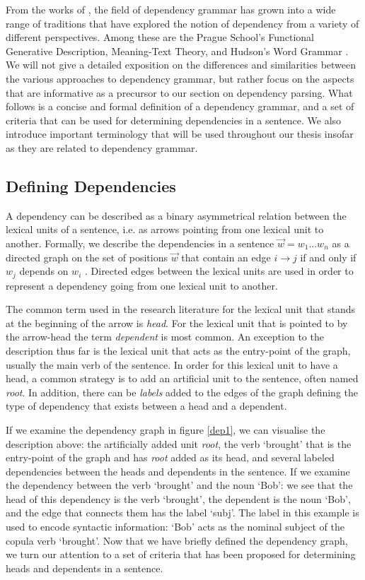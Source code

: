 From the works of \citeauthor{Tes:15}, the field of dependency grammar has grown into a wide range of traditions that have explored the notion of dependency from a variety of different perspectives. Among these are the Prague School's Functional Generative Description, Meaning-Text Theory, and Hudson's Word Grammar \cite{Sgall:86, Mel:88, Hudson:90}. We will not give a detailed exposition on the differences and similarities between the various approaches to dependency grammar, but rather focus on the aspects that are informative as a precursor to our section on dependency parsing. What follows is a concise and formal definition of a dependency grammar, and a set of criteria that can be used for determining dependencies in a sentence. We also introduce important terminology that will be used throughout our thesis insofar as they are related to dependency grammar.

\subsection{Defining Dependencies}
\label{definitions}

A dependency can be described as a binary asymmetrical relation between the lexical units of a sentence, i.e. as arrows pointing from one lexical unit to another. Formally, we describe the dependencies in a sentence $\vec{w} = w_1 ... w_n$ as a directed graph on the set of positions $\vec{w}$ that contain an edge $i \rightarrow j$ if and only if $w_j$ depends on $w_i$ \cite{Kuhl:10}. Directed edges between the lexical units are used in order to represent a dependency going from one lexical unit to another.

The common term used in the research literature for the lexical unit that stands at the beginning of the arrow is \textit{head}. For the lexical unit that is pointed to by the arrow-head the term \textit{dependent} is most common. An exception to the description thus far is the lexical unit that acts as the entry-point of the graph, usually the main verb of the sentence. In order for this lexical unit to have a head, a common strategy is to add an artificial unit to the sentence, often named \textit{root}. In addition, there can be \textit{labels} added to the edges of the graph defining the type of dependency that exists between a head and a dependent.

If we examine the dependency graph in figure \ref{dep1}, we can visualise the description above: the artificially added unit \textit{root}, the verb `brought' that is the entry-point of the graph and has \textit{root} added as its head, and several labeled dependencies between the heads and dependents in the sentence. If we examine the dependency between the verb `brought' and the noun `Bob': we see that the head of this dependency is the verb `brought', the dependent is the noun `Bob', and the edge that connects them has the label `subj'. The label in this example is used to encode syntactic information: `Bob' acts as the nominal subject of the copula verb `brought'. Now that we have briefly defined the dependency graph, we turn our attention to a set of criteria that has been proposed for determining heads and dependents in a sentence.

